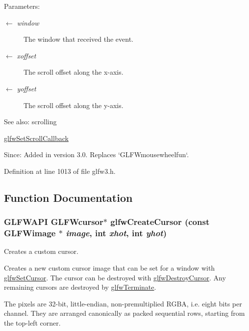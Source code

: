 \begin{Desc}
\item[Parameters:]
\begin{description}
\item[\mbox{$\leftarrow$} {\em window}]The window that received the event. \item[\mbox{$\leftarrow$} {\em xoffset}]The scroll offset along the x-axis. \item[\mbox{$\leftarrow$} {\em yoffset}]The scroll offset along the y-axis.\end{description}
\end{Desc}
\begin{Desc}
\item[See also:]scrolling 

\hyperlink{group__input_g29011514e93368712a3063a28707ced3}{glfwSetScrollCallback}\end{Desc}
\begin{Desc}
\item[Since:]Added in version 3.0. Replaces `GLFWmousewheelfun`. \end{Desc}


Definition at line 1013 of file glfw3.h.

\subsection{Function Documentation}
\hypertarget{group__input_gc0f0f691f2d110f9acfb4bfe07f1216c}{
\subsubsection[glfwCreateCursor]{\setlength{\rightskip}{0pt plus 5cm}GLFWAPI {\bf GLFWcursor}$\ast$ glfwCreateCursor (const {\bf GLFWimage} $\ast$ {\em image}, \/  int {\em xhot}, \/  int {\em yhot})}}
\label{group__input_gc0f0f691f2d110f9acfb4bfe07f1216c}


Creates a custom cursor. 

Creates a new custom cursor image that can be set for a window with \hyperlink{group__input_gfaf103cea2f43530cff7de4e01126a4f}{glfwSetCursor}. The cursor can be destroyed with \hyperlink{group__input_g27556b7122117bc1bbb4bb3cc003ea43}{glfwDestroyCursor}. Any remaining cursors are destroyed by \hyperlink{group__init_gfd90e6fd4819ea9e22e5e739519a6504}{glfwTerminate}.

The pixels are 32-bit, little-endian, non-premultiplied RGBA, i.e. eight bits per channel. They are arranged canonically as packed sequential rows, starting from the top-left corner.

